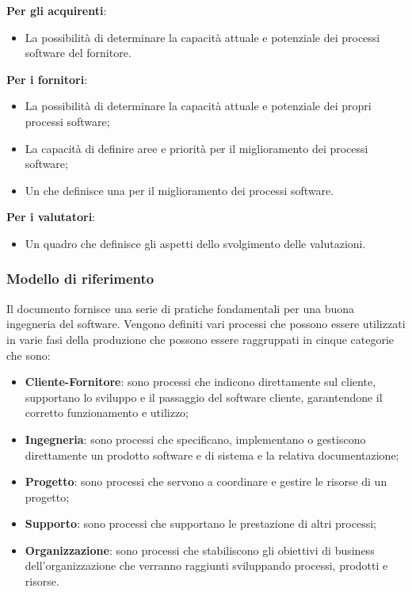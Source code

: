 \documentclass[../piano-di-qualifica.tex]{subfiles}
\begin{document}
\textbf{Per gli acquirenti}:
\begin{itemize}
    \item La possibilità di determinare la capacità attuale e potenziale dei processi software del fornitore.
\end{itemize}

\textbf{Per i fornitori}:
\begin{itemize}
    \item La possibilità di determinare la capacità attuale e potenziale dei propri processi software;
    \item La capacità di definire aree e priorità per il miglioramento dei processi software;
    \item Un  che definisce una  per il miglioramento dei processi software.
\end{itemize}

\textbf{Per i valutatori}:
\begin{itemize}
    \item Un quadro che definisce gli aspetti dello svolgimento delle valutazioni.
\end{itemize}

\subsubsection{Modello di riferimento}
\label{sub:modello_di_riferimento}
Il documento fornisce una serie di pratiche fondamentali per una buona ingegneria del software.
Vengono definiti vari processi che possono essere utilizzati in varie fasi della produzione che possono essere raggruppati in cinque categorie che sono:

\begin{itemize}
    \item \textbf{Cliente-Fornitore}: sono processi che indicono direttamente sul cliente, supportano lo sviluppo e il passaggio del software cliente, garantendone il corretto funzionamento e utilizzo;
    \item \textbf{Ingegneria}: sono processi che specificano, implementano o gestiscono direttamente un prodotto software e di sistema e la relativa documentazione;
    \item \textbf{Progetto}: sono processi che servono a coordinare e gestire le risorse di un progetto;
    \item \textbf{Supporto}: sono processi che supportano le prestazione di altri processi;
    \item \textbf{Organizzazione}: sono processi che stabiliscono gli obiettivi di business dell'organizzazione che verranno raggiunti sviluppando processi, prodotti e risorse.
\end{itemize}
\end{document}
